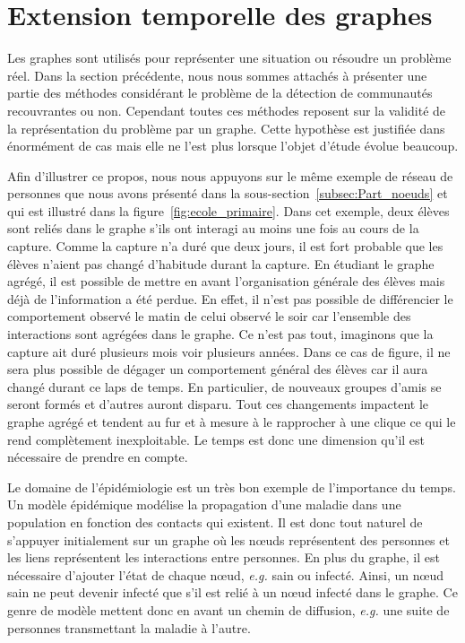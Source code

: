 \section{Extension temporelle des graphes}
\label{sec:intro_extension_temporelle}

Les graphes sont utilisés pour représenter une situation ou résoudre un problème réel.
Dans la section précédente, nous nous sommes attachés à présenter une partie des méthodes considérant le problème de la détection de communautés recouvrantes ou non.
Cependant toutes ces méthodes reposent sur la validité de la représentation du problème par un graphe.
Cette hypothèse est justifiée dans énormément de cas mais elle ne l'est plus lorsque l'objet d'étude évolue beaucoup.

Afin d'illustrer ce propos, nous nous appuyons sur le même exemple de réseau de personnes que nous avons présenté dans la sous-section~\ref{subsec:Part_noeuds} et qui est illustré dans la figure~\ref{fig:ecole_primaire}.
Dans cet exemple, deux élèves sont reliés dans le graphe s'ils ont interagi au moins une fois au cours de la capture.
Comme la capture n'a duré que deux jours, il est fort probable que les élèves n'aient pas changé d'habitude durant la capture.
En étudiant le graphe agrégé, il est possible de mettre en avant l'organisation générale des élèves mais déjà de l'information a été perdue.
En effet, il n'est pas possible de différencier le comportement observé le matin de celui observé le soir car l'ensemble des interactions sont agrégées dans le graphe.
Ce n'est pas tout, imaginons que la capture ait duré plusieurs mois voir plusieurs années.
Dans ce cas de figure, il ne sera plus possible de dégager un comportement général des élèves car il aura changé durant ce laps de temps.
En particulier, de nouveaux groupes d'amis se seront formés et d'autres auront disparu.
Tout ces changements impactent le graphe agrégé et tendent au fur et à mesure à le rapprocher à une clique ce qui le rend complètement inexploitable.
Le temps est donc une dimension qu'il est nécessaire de prendre en compte.

Le domaine de l'épidémiologie est un très bon exemple de l'importance du temps.
Un modèle épidémique modélise la propagation d'une maladie dans une population en fonction des contacts qui existent.
Il est donc tout naturel de s'appuyer initialement sur un graphe où les n\oe uds représentent des personnes et les liens représentent les interactions entre personnes.
En plus du graphe, il est nécessaire d'ajouter l'état de chaque n\oe ud, \emph{e.g.} sain ou infecté.
Ainsi, un n\oe ud sain ne peut devenir infecté que s'il est relié à un n\oe ud infecté dans le graphe.
Ce genre de modèle mettent donc en avant un chemin de diffusion, \emph{e.g.} une suite de personnes transmettant la maladie à l'autre.

